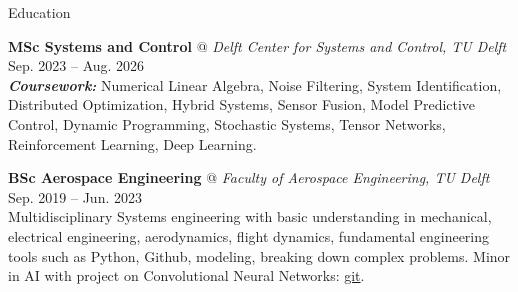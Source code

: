 \documentclass{resume} %
\begin{document}
\hypersetup{
    colorlinks=true,
    allcolors=darkblue
}


\begin{rSection}{Education}

{\bf MSc Systems and Control} @ \textit{Delft Center for Systems and Control, TU Delft} \hfill {Sep. 2023 -- Aug. 2026}\\
\textbf{\textit{Coursework:}}  Numerical Linear Algebra, Noise Filtering, System Identification, Distributed Optimization, Hybrid Systems, Sensor Fusion, Model Predictive Control, Dynamic Programming, Stochastic Systems, Tensor Networks, Reinforcement Learning, Deep Learning.\vspace*{1mm}

{\bf BSc Aerospace Engineering} @ \textit{Faculty of Aerospace Engineering, TU Delft} \hfill {Sep. 2019 -- Jun. 2023}\\
Multidisciplinary Systems engineering with basic understanding in mechanical, electrical engineering, aerodynamics, flight dynamics, fundamental engineering tools such as Python, Github, modeling, breaking down complex problems. Minor in AI with project on Convolutional Neural Networks: \href{https://github.com/POTN1K/CompressionFlowAE}{git}. 


\end{rSection}
\end{document}
